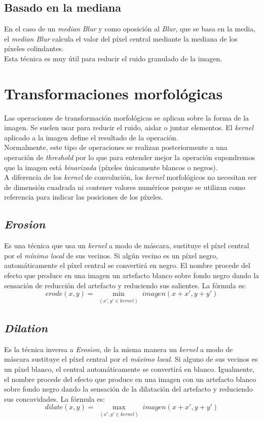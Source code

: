 \subsection{Basado en la mediana}
En el caso de un \emph{median Blur} y como oposición al \emph{Blur},
que se basa en la media, el \emph{median Blur} calcula el valor
del píxel central mediante la mediana de los píxeles colindantes. \\
Esta técnica es muy útil para reducir el ruido granulado de la imagen.

\section{Transformaciones morfológicas}
Las operaciones de transformación morfológicas se aplican sobre la
forma de la imagen. Se suelen usar para reducir el ruido, aislar o
juntar elementos. El \emph{kernel} aplicado a la imagen define el
resultado de la operación. \\
Normalmente, este tipo de operaciones se realizan posteriormente a una
operación de \emph{threshold} por lo que para entender mejor la
operación supondremos que la imagen está \emph{binarizada} (píxeles
únicamente blancos o negros). \\
A diferencia de los \emph{kernel} de convolución, los \emph{kernel}
morfológicos no necesitan ser de dimensión cuadrada ni contener
valores numéricos porque se utilizan como referencia para indicar las
posiciones de los píxeles.
\subsection{\emph{Erosion}}
Es una técnica que usa un \emph{kernel} a modo de máscara, sustituye
el píxel central por el \emph{mínimo local} de sus vecinos. Si algún
vecino es un píxel negro, automáticamente el píxel central se
convertirá en negro. El nombre procede del efecto que produce en una
imagen un artefacto blanco sobre fondo negro dando la sensación de
reducción del artefacto y reduciendo sus salientes. La fórmula es:
\begin{equation*}
  erode(x, y) = \min_{\substack{(x', y' \in kernel)}} imagen(x + x', y + y')
\end{equation*}

\subsection{\emph{Dilation}}
Es la técnica inversa a \emph{Erosion}, de la misma manera un
\emph{kernel} a modo de máscara sustituye el píxel central por el
\emph{máximo local}. Si alguno de sus vecinos es un píxel blanco, el
central automáticamente se convertirá en blanco. Igualmente, el nombre
procede del efecto que produce en una imagen con un artefacto blanco
sobre fondo negro dando la sensación de la dilatación del artefacto y
reduciendo sus concavidades. La fórmula es:
\begin{equation*}
  dilate(x, y) = \max_{\substack{(x', y' \in kernel)}} imagen(x + x', y + y')
\end{equation*}

